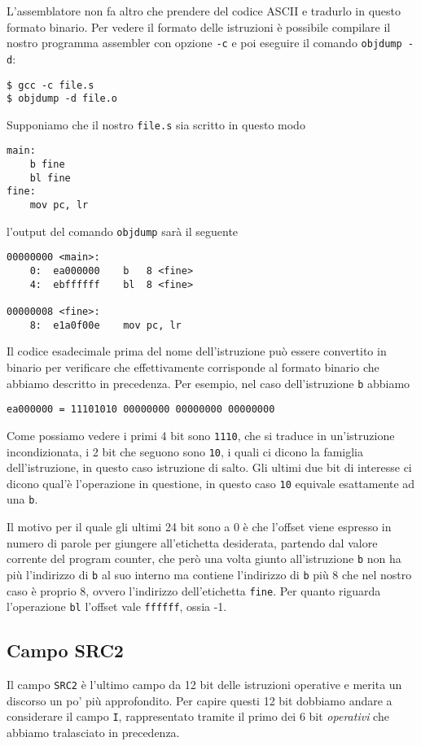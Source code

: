 L'assemblatore non fa altro che prendere del codice ASCII e tradurlo in questo formato binario. Per
vedere il formato delle istruzioni è possibile compilare il nostro programma assembler con opzione
\verb|-c| e poi eseguire il comando \verb|objdump -d|:
\begin{verbatim}
$ gcc -c file.s
$ objdump -d file.o	
\end{verbatim}
Supponiamo che il nostro \verb|file.s| sia scritto in questo modo
\begin{verbatim}
main:
	b fine
	bl fine
fine:
	mov pc, lr
\end{verbatim}
l'output del comando \verb|objdump| sarà il seguente
\begin{verbatim}
00000000 <main>:
	0:	ea000000	b	8 <fine>
	4:	ebffffff	bl	8 <fine>

00000008 <fine>:
	8:	e1a0f00e	mov	pc, lr
\end{verbatim}
Il codice esadecimale prima del nome dell'istruzione può essere convertito in binario per
verificare che effettivamente corrisponde al formato binario che abbiamo descritto in precedenza.
Per esempio, nel caso dell'istruzione \verb|b| abbiamo
\begin{center}
	\verb|ea000000 = 11101010 00000000 00000000 00000000|
\end{center}
Come possiamo vedere i primi 4 bit sono \verb|1110|, che si traduce in un'istruzione incondizionata,
i 2 bit che seguono sono \verb|10|, i quali ci dicono la famiglia dell'istruzione, in questo caso
istruzione di salto. Gli ultimi due bit di interesse ci dicono qual'è l'operazione in questione,
in questo caso \verb|10| equivale esattamente ad una \verb|b|.

Il motivo per il quale gli ultimi 24 bit sono a 0 è che l'offset viene espresso in numero di parole
per giungere all'etichetta desiderata, partendo dal valore corrente del program counter, che però
una volta giunto all'istruzione \verb|b| non ha più l'indirizzo di \verb|b| al suo interno ma
contiene l'indirizzo di \verb|b| più 8 che nel nostro caso è proprio 8, ovvero l'indirizzo
dell'etichetta \verb|fine|. Per quanto riguarda l'operazione \verb|bl| l'offset vale \verb|ffffff|,
ossia -1.

\subsection{Campo SRC2}
Il campo \verb|SRC2| è l'ultimo campo da 12 bit delle istruzioni operative e merita un discorso un
po' più approfondito. Per capire questi 12 bit dobbiamo andare a considerare il campo \verb|I|,
rappresentato tramite il primo dei 6 bit \emph{operativi} che abbiamo tralasciato in precedenza.

